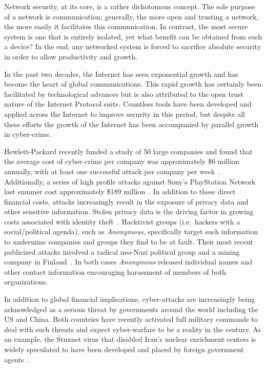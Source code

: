 Network security, at its core, is a rather dichotomous concept. The sole
purpose of a network is communication; generally, the more open and
trusting a network, the more easily it facilitates this communication. In
contrast, the most secure system is one that is entirely isolated, yet what
benefit can be obtained from such a device? In the end, any networked
system is forced to sacrifice absolute security in order to allow
productivity and growth.

In the past two decades, the Internet has seen exponential growth and has
become the heart of global communications.  This rapid growth has certainly
been facilitated by technological advances but is also attributed to the
open trust nature of the Internet Protocol suite.  Countless tools have
been developed and applied across the Internet to improve security in this
period, but despite all these efforts the growth of the Internet has been
accompanied by parallel growth in cyber-crime.

Hewlett-Packard recently funded a study of 50 large companies and found
that the average cost of cyber-crime per company was approximately \$6
million annually, with at least one successful attack per company per
week~\cite{Ponemon_2011}.  Additionally, a series of high profile attacks
against Sony's PlayStation Network last summer cost approximately \$189
million~\cite{Aamoth_2011}.  In addition to these direct financial costs,
attacks increasingly result in the exposure of privacy data and other
sensitive information.  Stolen privacy data is the driving factor in
growing costs associated with identity
theft~\cite{Schultz_2011}. Hacktivist groups (i.e.\ hackers with a
social/political agenda), such as \emph{Anonymous}, specifically target
such information to undermine companies and groups they find to be at
fault. Their most recent publicized attacks involved a radical neo-Nazi
political group and a mining company in Finland~\cite{Brook_2011}. In both
cases \emph{Anonymous} released individual names and other contact
information encouraging harassment of members of both organizations.

In addition to global financial implications, cyber-attacks are
increasingly being acknowledged as a serious threat by governments around
the world including the US and China. Both countries have recently
activated full military commands to deal with such threats and expect
cyber-warfare to be a reality in the  century. As an example, the
Stuxnet virus that disabled Iran's nuclear enrichment centers is widely
speculated to have been developed and placed by foreign government
agents~\cite{Broad_2011}.

